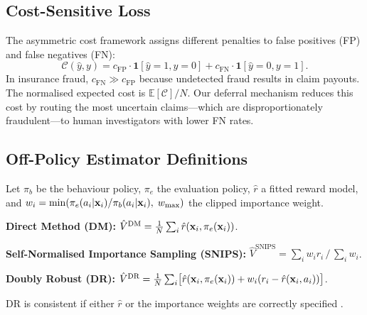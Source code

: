 \subsection{Cost-Sensitive Loss}

The asymmetric cost framework assigns different penalties to false positives (FP) and false negatives (FN):
\begin{equation}
\mathcal{C}(\hat{y}, y) = c_{\text{FP}} \cdot \mathbf{1}[\hat{y} = 1, y = 0] + c_{\text{FN}} \cdot \mathbf{1}[\hat{y} = 0, y = 1].
\end{equation}
In insurance fraud, $c_{\text{FN}} \gg c_{\text{FP}}$ because undetected fraud results in claim payouts. The normalised expected cost is $\mathbb{E}[\mathcal{C}] / N$. Our deferral mechanism reduces this cost by routing the most uncertain claims---which are disproportionately fraudulent---to human investigators with lower FN rates.

\subsection{Off-Policy Estimator Definitions}

Let $\pi_b$ be the behaviour policy, $\pi_e$ the evaluation policy, $\hat{r}$ a fitted reward model, and $w_i = \min(\pi_e(a_i | \mathbf{x}_i) / \pi_b(a_i | \mathbf{x}_i),\; w_{\max})$ the clipped importance weight.

\textbf{Direct Method (DM):} $\hat{V}^{\text{DM}} = \frac{1}{N}\sum_i \hat{r}(\mathbf{x}_i, \pi_e(\mathbf{x}_i))$.

\textbf{Self-Normalised Importance Sampling (SNIPS):}
$\hat{V}^{\text{SNIPS}} = \sum_i w_i r_i \,/\, \sum_i w_i$.

\textbf{Doubly Robust (DR):}
$\hat{V}^{\text{DR}} = \frac{1}{N}\sum_i \bigl[\hat{r}(\mathbf{x}_i, \pi_e(\mathbf{x}_i)) + w_i (r_i - \hat{r}(\mathbf{x}_i, a_i))\bigr]$.

\noindent DR is consistent if either $\hat{r}$ or the importance weights are correctly specified \citep{dudik2011doubly}.
